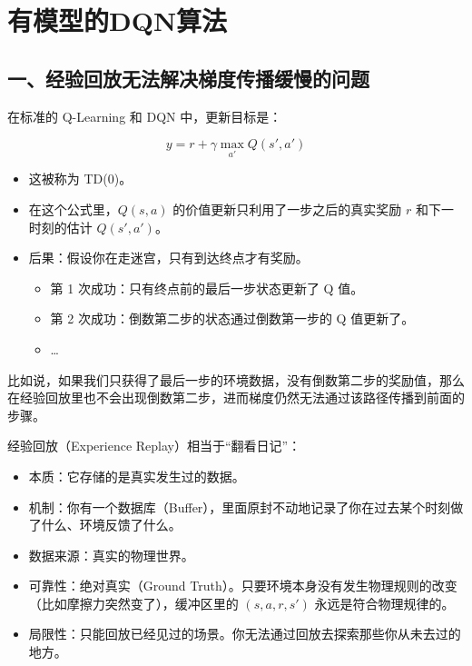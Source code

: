 \setcounter{section}{7}

\hypertarget{ux6709ux6a21ux578bux7684dqnux7b97ux6cd5}{%
\section{有模型的DQN算法}\label{ux6709ux6a21ux578bux7684dqnux7b97ux6cd5}}

\hypertarget{ux4e00ux7ecfux9a8cux56deux653eux65e0ux6cd5ux89e3ux51b3ux68afux5ea6ux4f20ux64adux7f13ux6162ux7684ux95eeux9898}{%
\subsection{一、经验回放无法解决梯度传播缓慢的问题}\label{ux4e00ux7ecfux9a8cux56deux653eux65e0ux6cd5ux89e3ux51b3ux68afux5ea6ux4f20ux64adux7f13ux6162ux7684ux95eeux9898}}

在标准的 Q-Learning 和 DQN 中，更新目标是：

\[
y=r+\gamma \max_{a'}Q(s',a')
\]

\begin{itemize}
\tightlist
\item
  这被称为 TD(0)。
\item
  在这个公式里，\(Q(s,a)\) 的价值更新只利用了一步之后的真实奖励 \(r\) 和下一时刻的估计 \(Q(s',a')\)。
\item
  后果：假设你在走迷宫，只有到达终点才有奖励。

  \begin{itemize}
  \tightlist
  \item
    第 1 次成功：只有终点前的最后一步状态更新了 Q 值。
  \item
    第 2 次成功：倒数第二步的状态通过倒数第一步的 Q 值更新了。
  \item
    \ldots{}
  \end{itemize}
\end{itemize}

比如说，如果我们只获得了最后一步的环境数据，没有倒数第二步的奖励值，那么在经验回放里也不会出现倒数第二步，进而梯度仍然无法通过该路径传播到前面的步骤。

经验回放（Experience Replay）相当于``翻看日记''：

\begin{itemize}
\tightlist
\item
  本质：它存储的是真实发生过的数据。
\item
  机制：你有一个数据库（Buffer），里面原封不动地记录了你在过去某个时刻做了什么、环境反馈了什么。
\item
  数据来源：真实的物理世界。
\item
  可靠性：绝对真实（Ground Truth）。只要环境本身没有发生物理规则的改变（比如摩擦力突然变了），缓冲区里的 \((s,a,r,s')\) 永远是符合物理规律的。
\item
  局限性：只能回放已经见过的场景。你无法通过回放去探索那些你从未去过的地方。
\end{itemize}

